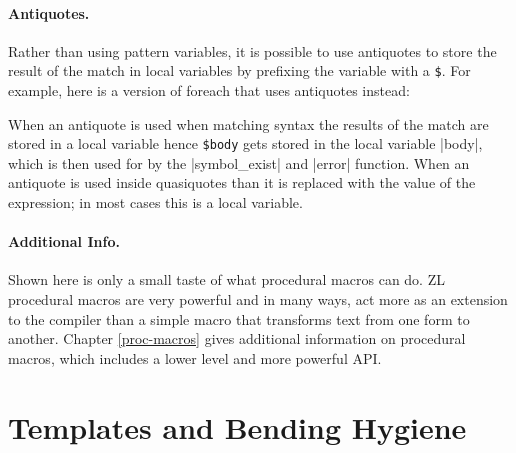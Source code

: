 \paragraph{Antiquotes.}

Rather than using pattern variables, it is possible to use antiquotes
to store the result of the match in local variables by prefixing the
variable with a \verb/$/.  For example, here is a version of foreach
that uses antiquotes instead:

When an antiquote is used when matching syntax the results of the
match are stored in a local variable hence \verb/$body/ gets stored in
the local variable |body|, which is then used for by the
|symbol_exist| and |error| function.  When an antiquote is used inside
quasiquotes than it is replaced with the value of the expression; in
most cases this is a local variable.

\paragraph{Additional Info.}

Shown here is only a small taste of what procedural macros can do.  ZL
procedural macros are very powerful and in many ways, act more as
an extension to the compiler than a simple macro that transforms text
from one form to another.  Chapter \ref{proc-macros} gives additional
information on procedural macros, which includes a lower level and
more powerful API.

\section{Templates and Bending Hygiene}
\label{mk_vector}

